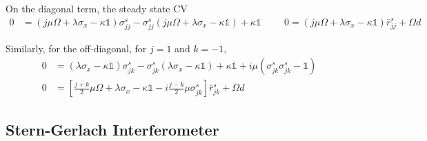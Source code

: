 \documentclass[%
reprint,
superscriptaddress,
nofootinbib,
 amsmath,amssymb,
prx,
floatfix,
]{revtex4-2}
\begin{document}
 On the diagonal term, the steady state CV
\begin{align}
0 &=   \left( j \mu \Omega  + \lambda \sigma_x  - \kappa \mathds{1} \right)    \sigma_{jj}^s - \sigma_{jj}^s  \left( j \mu \Omega  + \lambda \sigma_x  - \kappa \mathds{1} \right)  + \kappa \mathds{1} \hspace{1cm} 
        0  = \left( j \mu \Omega  + \lambda \sigma_x  - \kappa \mathds{1} \right)    \bar{r}_{jj}^s + 
      \Omega  d 
   \end{align}
 
Similarly, for the off-diagonal, for $j= 1$ and $k=-1$,
\begin{align}
0 & = \left(  \lambda \sigma_x  - \kappa \mathds{1} \right)    \sigma_{jk}^s - \sigma_{jk}^s  \left(\lambda \sigma_x  - \kappa \mathds{1} \right)  + \kappa \mathds{1} + i  \mu \left( \sigma_{jk}^s \sigma_{jk}^s - \mathds{1} \right)
\nonumber  \\
        0 & = \left[  \frac{j+k}{2} \mu \Omega  + \lambda \sigma_x  - \kappa \mathds{1} - i  \frac{j-k}{2} \mu \sigma_{jk}^s \right]    \bar{r}_{jk}^s + 
      \Omega  d  
   \end{align}








\subsection{Stern-Gerlach Interferometer}
\end{document}
